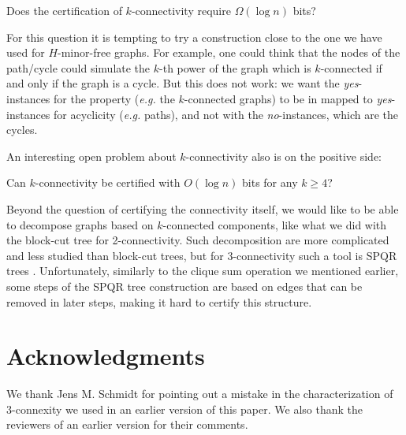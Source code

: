 \documentclass[a4paper,thm-restate,USenglish]{lipics-v2019}
\begin{document}
\begin{question}
Does the certification of $k$-connectivity require $\Omega(\log n)$ bits?
\end{question}

For this question it is tempting to try a construction close to the one we have used for $H$-minor-free graphs. For example, one could think that the nodes of the path/cycle could simulate the $k$-th power of the graph which is $k$-connected if and only if the graph is a cycle. 
But this does not work: we want the \emph{yes}-instances for the property (\emph{e.g.} the $k$-connected graphs) to be in mapped to \emph{yes}-instances for acyclicity (\emph{e.g.} paths), and not with the \emph{no}-instances, which are the cycles. 

An interesting open problem about $k$-connectivity also is on the positive side:

\begin{question}
Can $k$-connectivity be certified with $O(\log n)$ bits for any $k \ge 4$?
\end{question}

Beyond the question of certifying the connectivity itself, we would like to be able to decompose graphs based on $k$-connected components, like what we did with the block-cut tree for 2-connectivity. 
Such decomposition are more complicated and less studied than block-cut trees, but for 3-connectivity such a tool is  SPQR trees \cite{BattistaT89}. Unfortunately, similarly to the clique sum operation we mentioned earlier, some steps of the SPQR tree construction are based on edges that can be removed in later steps, making it hard to certify this structure.

\section*{Acknowledgments}

We thank Jens M. Schmidt for pointing out a mistake in the characterization of 3-connexity we used in an earlier version of this paper. We also thank the reviewers of an earlier version for their comments.



\end{document}

